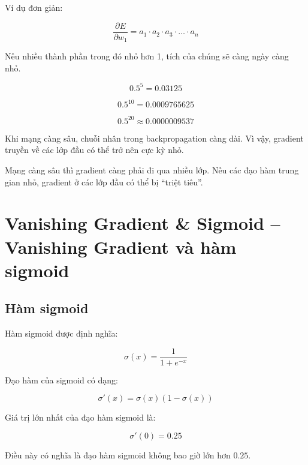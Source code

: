 Ví dụ đơn giản:

\[
    \frac{\partial E}{\partial w_1}
    =
    a_1 \cdot a_2 \cdot a_3 \cdot \ldots \cdot a_n
\]

Nếu nhiều thành phần trong đó nhỏ hơn 1, tích của chúng sẽ càng ngày càng nhỏ.

\[
    0.5^5 = 0.03125
\]

\[
    0.5^{10} = 0.0009765625
\]

\[
    0.5^{20} \approx 0.0000009537
\]

Khi mạng càng sâu, chuỗi nhân trong backpropagation càng dài. Vì vậy, gradient truyền về các lớp đầu có thể trở nên cực kỳ nhỏ.

\begin{ghinho}
Mạng càng sâu thì gradient càng phải đi qua nhiều lớp. Nếu các đạo hàm trung gian nhỏ, gradient ở các lớp đầu có thể bị ``triệt tiêu''.
\end{ghinho}

\section{Vanishing Gradient \& Sigmoid -- Vanishing Gradient và hàm sigmoid}

\subsection{Hàm sigmoid}

Hàm sigmoid được định nghĩa:

\[
    \sigma(x)=\frac{1}{1+e^{-x}}
\]

Đạo hàm của sigmoid có dạng:

\[
    \sigma'(x)=\sigma(x)(1-\sigma(x))
\]

Giá trị lớn nhất của đạo hàm sigmoid là:

\[
    \sigma'(0)=0.25
\]

Điều này có nghĩa là đạo hàm sigmoid không bao giờ lớn hơn $0.25$.

\begin{center}
\end{center}


